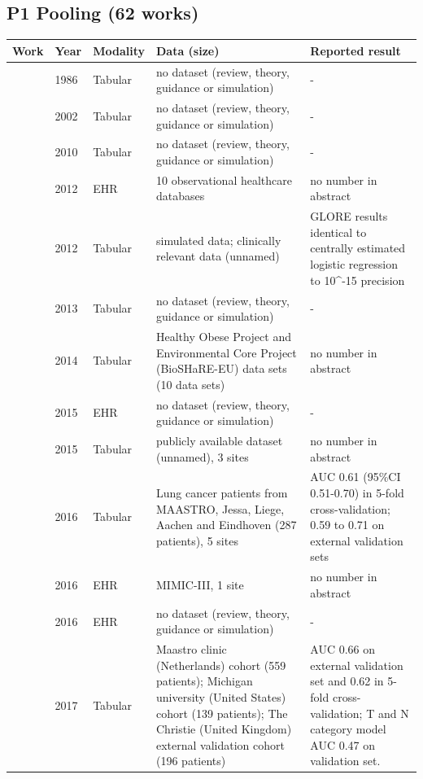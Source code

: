\subsection*{P1 Pooling (62 works)}
\begin{longtable}{@{}p{2.6cm}p{0.7cm}p{1.2cm}p{4.4cm}p{4.6cm}@{}}
\toprule
Work & Year & Modality & Data (size) & Reported result\\
\midrule
\endhead
\cite{dersimonian1986meta} & 1986 & Tabular & no dataset (review, theory, guidance or simulation) & -\\
\cite{sweeney2002k} & 2002 & Tabular & no dataset (review, theory, guidance or simulation) & -\\
\cite{riley2010meta} & 2010 & Tabular & no dataset (review, theory, guidance or simulation) & -\\
\cite{overhage2012validation} & 2012 & EHR & 10 observational healthcare databases & no number in abstract\\
\cite{wu2012grid} & 2012 & Tabular & simulated data; clinically relevant data (unnamed) & GLORE results identical to centrally estimated logistic regression to 10\textasciicircum{}-15 precision\\
\cite{jiang2013webglore} & 2013 & Tabular & no dataset (review, theory, guidance or simulation) & -\\
\cite{gaye2014datashield} & 2014 & Tabular & Healthy Obese Project and Environmental Core Project (BioSHaRE-EU) data sets (10 data sets) & no number in abstract\\
\cite{hripcsak2015observational} & 2015 & EHR & no dataset (review, theory, guidance or simulation) & -\\
\cite{lu2015webdisco} & 2015 & Tabular & publicly available dataset (unnamed), 3 sites & no number in abstract\\
\cite{jochems2016distributed} & 2016 & Tabular & Lung cancer patients from MAASTRO, Jessa, Liege, Aachen and Eindhoven (287 patients), 5 sites & AUC 0.61 (95\%CI 0.51-0.70) in 5-fold cross-validation; 0.59 to 0.71 on external validation sets\\
\cite{johnson2016mimic} & 2016 & EHR & MIMIC-III, 1 site & no number in abstract\\
\cite{mandel2016smart} & 2016 & EHR & no dataset (review, theory, guidance or simulation) & -\\
\cite{jochems2017developing} & 2017 & Tabular & Maastro clinic (Netherlands) cohort (559 patients); Michigan university (United States) cohort (139 patients); The Christie (United Kingdom) external validation cohort (196 patients) & AUC 0.66 on external validation set and 0.62 in 5-fold cross-validation; T and N category model AUC 0.47 on validation set.\\

\end{longtable}
